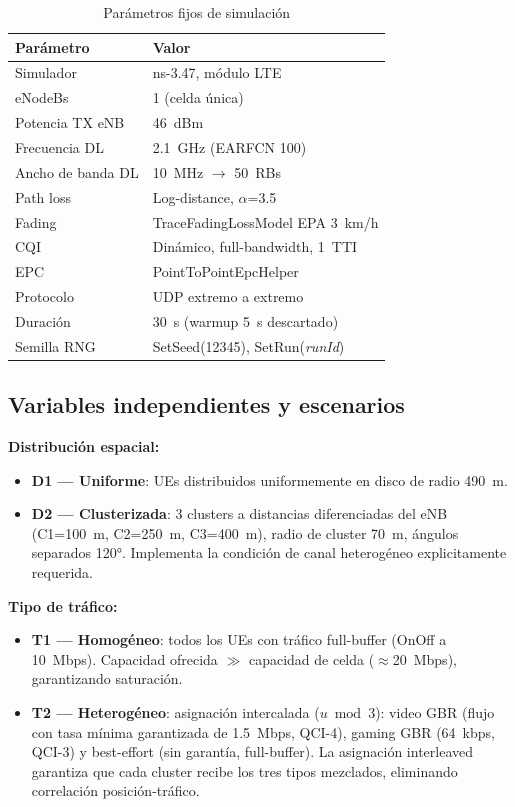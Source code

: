 \documentclass[conference]{IEEEtran}
\begin{document}
\begin{table}[t]
  \centering
  \caption{Parámetros fijos de simulación}
  \label{tab:params}
  \footnotesize
  \begin{tabular}{@{}ll@{}}
    \toprule
    \textbf{Parámetro} & \textbf{Valor} \\
    \midrule
    Simulador          & ns-3.47, módulo LTE \\
    eNodeBs            & 1 (celda única) \\
    Potencia TX eNB    & 46~dBm \\
    Frecuencia DL      & 2.1~GHz (EARFCN 100) \\
    Ancho de banda DL  & 10~MHz $\to$ 50~RBs \\
    Path loss          & Log-distance, $\alpha$=3.5 \\
    Fading             & TraceFadingLossModel EPA 3~km/h \\
    CQI                & Dinámico, full-bandwidth, 1~TTI \\
    EPC                & PointToPointEpcHelper \\
    Protocolo          & UDP extremo a extremo \\
    Duración           & 30~s (warmup 5~s descartado) \\
    Semilla RNG        & SetSeed(12345), SetRun(\emph{runId}) \\
    \bottomrule
  \end{tabular}
\end{table}

\subsection{Variables independientes y escenarios}

\textbf{Distribución espacial:}
\begin{itemize}
  \item \textbf{D1 --- Uniforme}: UEs distribuidos uniformemente en disco de radio 490~m.
  \item \textbf{D2 --- Clusterizada}: 3 clusters a distancias diferenciadas del eNB
        (C1=100~m, C2=250~m, C3=400~m), radio de cluster 70~m, ángulos separados 120°.
        Implementa la condición de canal heterogéneo explicitamente requerida.
\end{itemize}

\textbf{Tipo de tráfico:}
\begin{itemize}
  \item \textbf{T1 --- Homogéneo}: todos los UEs con tráfico full-buffer (OnOff a 10~Mbps).
        Capacidad ofrecida $\gg$ capacidad de celda ($\approx$20~Mbps), garantizando saturación.
  \item \textbf{T2 --- Heterogéneo}: asignación intercalada ($u \bmod 3$):
        video GBR (flujo con tasa mínima garantizada de 1.5~Mbps, QCI-4),
        gaming GBR (64~kbps, QCI-3) y best-effort (sin garantía, full-buffer). La asignación
        interleaved garantiza que cada cluster recibe los tres tipos mezclados,
        eliminando correlación posición-tráfico.
\end{itemize}
\end{document}
